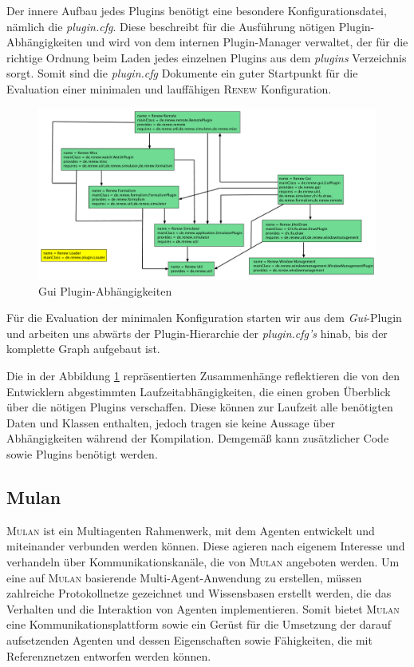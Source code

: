 		Der innere Aufbau jedes Plugins benötigt eine besondere Konfigurationsdatei, nämlich die \textit{plugin.cfg}. Diese beschreibt für die Ausführung nötigen Plugin-Abhängigkeiten und wird von dem internen Plugin-Manager verwaltet, der für die richtige Ordnung beim Laden jedes einzelnen Plugins aus dem \textit{plugins} Verzeichnis sorgt. Somit sind die \textit{plugin.cfg} Dokumente ein guter Startpunkt für die Evaluation einer minimalen und lauffähigen \textsc{Renew} Konfiguration. \bigbreak

		\begin{figure}[h!]
		  \centering
		  \includegraphics[width=\textwidth]{material/images/renew_plugin_dependencies2.pdf}
		  \caption{Gui Plugin-Abhängigkeiten}
		  \label{fig:plugin_deps}
		\end{figure}

		Für die Evaluation der minimalen Konfiguration starten wir aus dem \textit{Gui}-Plugin und arbeiten uns abwärts der Plugin-Hierarchie der \textit{plugin.cfg's} hinab, bis der komplette Graph aufgebaut ist.\newline

		Die in der Abbildung \ref{fig:plugin_deps} repräsentierten Zusammenhänge reflektieren die von den Entwicklern abgestimmten Laufzeitabhängigkeiten, die einen groben Überblick über die nötigen Plugins verschaffen. Diese können zur Laufzeit alle benötigten Daten und Klassen enthalten, jedoch tragen sie keine Aussage über Abhängigkeiten während der Kompilation. Demgemäß kann zusätzlicher Code sowie Plugins benötigt werden. 

	\subsection{Mulan} \label{sub:mulan}
		\textsc{Mulan} \cite{Roelke04} ist ein Multiagenten Rahmenwerk, mit dem Agenten entwickelt und miteinander verbunden werden können. Diese agieren nach eigenem Interesse und verhandeln über Kommunikationskanäle, die von \textsc{Mulan} angeboten werden. Um eine auf \textsc{Mulan} basierende Multi-Agent-Anwendung zu erstellen, müssen zahlreiche Protokollnetze gezeichnet und Wissensbasen erstellt werden, die das Verhalten und die Interaktion von Agenten implementieren. Somit bietet \textsc{Mulan} eine Kommunikationsplattform sowie ein Gerüst für die Umsetzung der darauf aufsetzenden Agenten und dessen Eigenschaften sowie Fähigkeiten, die mit Referenznetzen entworfen werden können. \cite{Cabac10a} \bigbreak

